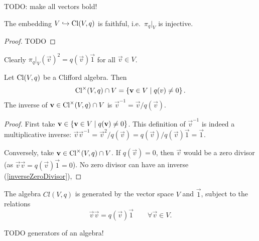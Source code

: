 TODO: make all vectors bold!

\begin{lemma}
The embedding $V\hookrightarrow \operatorname{Cl}(V,q)$ is faithful, i.e.\ $\pi_q|_V$ is injective.
\end{lemma}
\begin{proof}
TODO
\end{proof}
Clearly $\pi_q|_V(\vec{v})^2 = q(\vec{v}) \vec{1}$ for all $\vec{v}\in V$.

\begin{lemma} \label{vectorInverseCliffordAlgebra}
Let $\operatorname{Cl}(V,q)$ be a Clifford algebra. Then
\[ \operatorname{Cl}^\times(V,q) \cap V = \left\{ \boldsymbol{\mathrm{v}}\in V \;\middle|\; q(v) \neq 0 \right\}. \]
The inverse of $\boldsymbol{\mathrm{v}}\in \operatorname{Cl}^\times(V,q) \cap V$ is $\vec{v}^{-1} = \vec{v}/q(\vec{v})$.
\end{lemma}
\begin{proof}
First take $\boldsymbol{\mathrm{v}}\in \left\{ \boldsymbol{\mathrm{v}}\in V \;\middle|\; q(\boldsymbol{\mathrm{v}}) \neq 0 \right\}$. This definition of $\vec{v}^{-1}$ is indeed a multiplicative inverse: $\vec{v}\vec{v}^{-1} = \vec{v}^2/q(\vec{v}) = q(\vec{v})/q(\vec{v})\vec{1} = \vec{1}$.

Conversely, take $\boldsymbol{\mathrm{v}}\in \operatorname{Cl}^\times(V,q) \cap V$. If $q(\vec{v}) = 0$, then $\vec{v}$ would be a zero divisor (as $\vec{v}\vec{v} = q(\vec{v})\vec{1} = 0$). No zero divisor can have an inverse (\ref{inverseZeroDivisor}), 
\end{proof}

\begin{lemma} \label{CliffordRelation}
The algebra $Cl(V,q)$ is generated by the vector space $V$ and $\vec{1}$, subject to the relations
\[ \vec{v}\vec{v} = q(\vec{v})\vec{1} \qquad \forall \vec{v}\in V. \]
\end{lemma}
TODO generators of an algebra!


